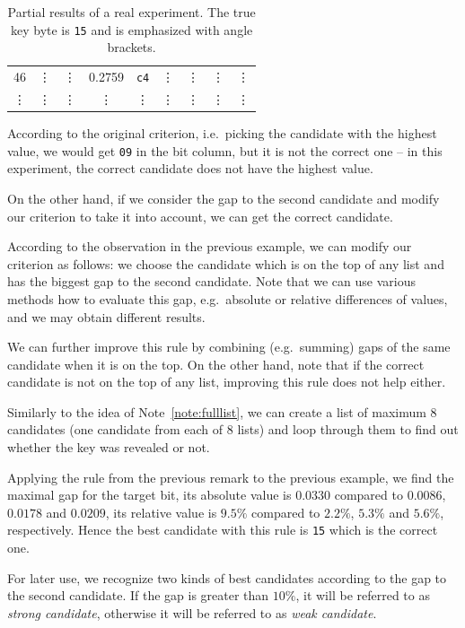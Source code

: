\begin{example}
\begin{table}[H]
\begin{center}
\begin{tabular}{| c | c | c | c | c | c | c | c | c |}
					46     & \vdots & \vdots     & 0.2759 & {\tt c4}   & \vdots & \vdots     & \vdots & \vdots     \\
					\vdots & \vdots & \vdots     & \vdots & \vdots     & \vdots & \vdots     & \vdots & \vdots     \\
				\hline
			\end{tabular}
			\end{center}
		\caption{Partial results of a real experiment. The true key byte is {\tt 15} and is emphasized with angle brackets.}
		\label{tab:gap}
		\end{table}
		According to the original criterion, i.e.\ picking the candidate with the highest value, we would get {\tt 09} in the  bit column, but it is not the correct one -- in this experiment, the correct candidate does not have the highest value.
		
		On the other hand, if we consider the gap to the second candidate and modify our criterion to take it into account, we can get the correct candidate.
	\end{example}
	
	\begin{remark}
	\label{rem:gap}
		According to the observation in the previous example, we can modify our criterion as follows: we choose the candidate which is on the top of any list and has the biggest gap to the second candidate. Note that we can use various methods how to evaluate this gap, e.g.\ absolute or relative differences of values, and we may obtain different results.
		
		We can further improve this rule by combining (e.g.\ summing) gaps of the same candidate when it is on the top. On the other hand, note that if the correct candidate is not on the top of any list, improving this rule does not help either.
		
		Similarly to the idea of Note~\ref{note:fulllist}, we can create a list of maximum $8$ candidates (one candidate from each of $8$ lists) and loop through them to find out whether the key was revealed or not.
	\end{remark}
	
	Applying the rule from the previous remark to the previous example, we find the maximal gap for the  target bit, its absolute value is $0.0330$ compared to $0.0086$, $0.0178$ and $0.0209$, its relative value is $9.5\%$ compared to $2.2\%$, $5.3\%$ and $5.6\%$, respectively. Hence the best candidate with this rule is {\tt 15} which is the correct one.
	
	\begin{note}
	\label{note:strong}
		For later use, we recognize two kinds of best candidates according to the gap to the second candidate. If the gap is greater than $10\%$, it will be referred to as {\em strong candidate}, otherwise it will be referred to as {\em weak candidate}.
	\end{note}